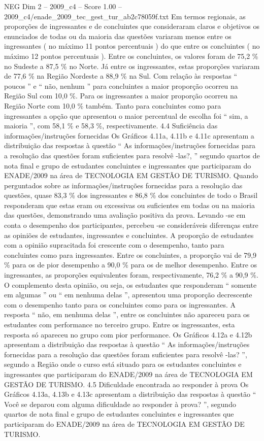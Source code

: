 \begin{textsample}{NEG Dim 2 – 2009\_c4 – Score 1.00 – 2009\_c4/enade\_2009\_tec\_gest\_tur\_ab2c78059f.txt}
Em termos regionais, as proporções de ingressantes e de concluintes que consideraram claros e objetivos os enunciados de todas ou da maioria das questões variaram menos entre os ingressantes ( no máximo 11 pontos percentuais ) do que entre os concluintes ( no máximo 12 pontos percentuais ).
Entre os concluintes, os valores foram de 75,2 \% no Sudeste a 87,5 \% no Norte.
Já entre os ingressantes, estas proporções variaram de 77,6 \% na Região Nordeste a 88,9 \% na Sul.
Com relação às respostas “ poucos ” e “ não, nenhum ” para concluintes a maior proporção ocorreu na Região Sul com 10,0 \%.
Para os ingressantes a maior proporção ocorreu na Região Norte com 10,0 \% também.
Tanto para concluintes como para ingressantes a opção que apresentou o maior percentual de escolha foi “ sim, a maioria ”, com 58,1 \% e 58,3 \%, respectivamente. 4.4 Suficiência das informações/instruções fornecidas Os Gráficos 4.11a, 4.11b e 4.11c apresentam a distribuição das respostas à questão “ As informações/instruções fornecidas para a resolução das questões foram suficientes para resolvê -las?, ” segundo quartos de nota final e grupo de estudantes concluintes e ingressantes que participaram do ENADE/2009 na área de TECNOLOGIA EM GESTÃO DE TURISMO.
Quando perguntados sobre as informações/instruções fornecidas para a resolução das questões, quase 83,3 \% dos ingressantes e 86,8 \% dos concluintes de todo o Brasil responderam que estas eram ou excessivas ou suficientes em todas ou na maioria das questões, demonstrando uma avaliação positiva da prova.
Levando -se em conta o desempenho dos participantes, percebeu -se consideráveis diferenças entre as opiniões de estudantes, ingressantes e concluintes.
A proporção de estudantes com a opinião supracitada foi crescente com o desempenho, tanto para concluintes como para ingressantes.
Entre os concluintes, a proporção vai de 79,9 \% para os de pior desempenho a 90,0 \% para os de melhor desempenho.
Entre os ingressantes, as proporções equivalentes foram, respectivamente, 76,2 \% a 90,9 \%.
O complemento desta opinião, ou seja, os estudantes que responderam “ somente em algumas ” ou “ em nenhuma delas ”, apresentou uma proporção decrescente com o desempenho tanto para os concluintes como para os ingressantes.
A resposta “ não, em nenhuma delas ”, entre os concluintes não apareceu para os estudantes com performance no terceiro grupo.
Entre os ingressantes, esta resposta só apareceu no grupo com pior performance.
Os Gráficos 4.12a e 4.12b apresentam a distribuição das respostas à questão “ As informações/instruções fornecidas para a resolução das questões foram suficientes para resolvê -las? ”, segundo a Região onde o curso está situado para os estudantes concluintes e ingressantes que participaram do ENADE/2009 na área de TECNOLOGIA EM GESTÃO DE TURISMO. 4.5 Dificuldade encontrada ao responder à prova Os Gráficos 4.13a, 4.13b e 4.13c apresentam a distribuição das respostas à questão “ Você se deparou com alguma dificuldade ao responder à prova? ”, segundo quartos de nota final e grupo de estudantes concluintes e ingressantes que participaram do ENADE/2009 na área de TECNOLOGIA EM GESTÃO DE TURISMO.

\end{textsample}
